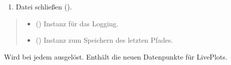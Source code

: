 \documentclass[letterpaper,10pt,english]{sphinxmanual}
\begin{document}
\begin{fulllineitems}
\begin{description}
\begin{enumerate}
\begin{description}
\begin{itemize}
\end{itemize}

\end{description}

\item {} 
\sphinxAtStartPar
{} Datei schließen ().

\end{enumerate}

\end{description}
\begin{quote}\begin{description}
\begin{itemize}
\item {} 
\sphinxAtStartPar
{} () \textendash{} Instanz für das Logging.

\item {} 
\sphinxAtStartPar
{} () \textendash{} Instanz zum Speichern des letzten Pfades.

\end{itemize}

\end{description}\end{quote}
\begin{description}
\begin{description}
\sphinxAtStartPar
Wird bei jedem  ausgelöst. Enthält die neuen Datenpunkte für
Live\sphinxhyphen{}Plots.

\sphinxAtStartPar
{}


\end{description}
\end{description}
\end{fulllineitems}
\end{document}
